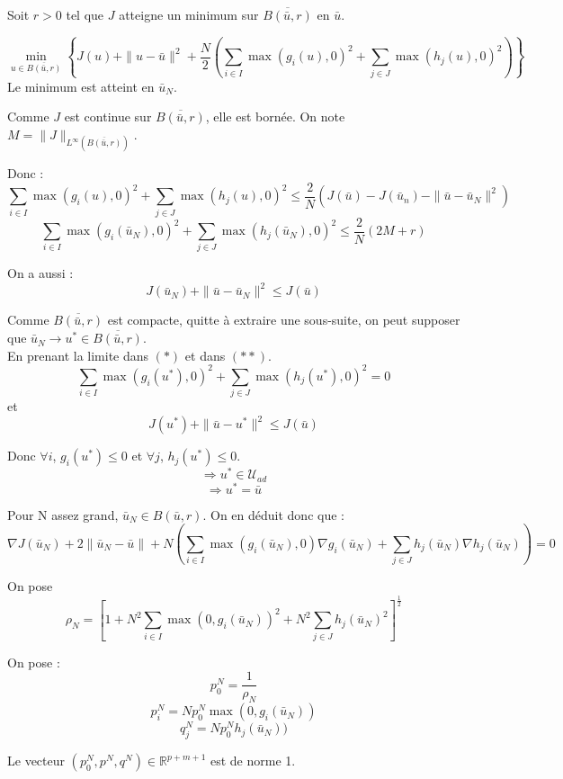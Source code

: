 \begin{dem}
Soit $r>0$ tel que $J$ atteigne un minimum sur $\overline{B(\bar{u},r)}$ en $\bar{u}$.

\[\min_{u\in\overline{B(\bar{u},r)}} \left\{J(u)+\|u-\bar{u}\|^2+\frac{N}{2}\left(\sum_{i\in I} \max (g_i(u),0)^2 + \sum_{j\in J} \max(h_j(u),0)^2 \right) \right\}\]
Le minimum est atteint en $\bar{u}_N$.

\bigskip
Comme $J$ est continue sur $\overline{B(\bar{u},r)}$, elle est bornée. On note $M=\|J\|_{L^\infty(\overline{B(\bar{u},r)})}$. 

\bigskip
Donc :
\[\sum_{i\in I} \max (g_i(u),0)^2 + \sum_{j\in J} \max(h_j(u),0)^2 \leq \frac{2}{N} \left(J(\bar{u})-J(\bar{u}_n)-\|\bar{u}-\bar{u}_N\|^2\right)\]
\begin{equation}\tag{$*$}
\sum_{i\in I} \max (g_i(\bar{u}_N),0)^2 + \sum_{j\in J} \max(h_j(\bar{u}_N),0)^2 \leq \frac{2}{N}(2M+r)
\end{equation}

On a aussi :
\begin{equation}\tag{$**$}
J(\bar{u}_N)+\|\bar{u}-\bar{u}_N\|^2 \leq J(\bar{u})
\end{equation}

Comme $\overline{B(\bar{u},r)}$ est compacte, quitte à extraire une sous-suite, on peut supposer que $\bar{u}_N\to u^*\in\overline{B(\bar{u},r)}$.\\
En prenant la limite dans $(*)$ et dans $(**)$.
\[\sum_{i\in I} \max (g_i(u^*),0)^2 + \sum_{j\in J} \max(h_j(u^*),0)^2 =0\]
et
\[J(u^*)+\|\bar{u}-u^*\|^2 \leq J(\bar{u})\]

Donc $\forall i$, $g_i(u^*)\leq 0$ et $\forall j$, $h_j(u^*)\leq 0$.
\[\Rightarrow u^*\in\mathcal{U}_{ad}\]
\[\Rightarrow u^*=\bar{u}\]

Pour N assez grand, $\bar{u}_N\in B(\bar{u},r)$. On en déduit donc que :
\begin{equation}
\tag{$*$}
\nabla J(\bar{u}_N)+2\|\bar{u}_N-\bar{u}\|+N\left(\sum_{i\in I} \max(g_i(\bar{u}_N),0)\nabla g_i(\bar{u}_N)+\sum_{j\in J} h_j(\bar{u}_N)\nabla h_j(\bar{u}_N)\right)=0
\end{equation}

On pose \[\rho_N=\left[ 1+N^2\sum_{i\in I} \max(0,g_i(\bar{u}_N))^2 + N^2\sum_{j\in J} h_j(\bar{u}_N)^2\right]^{\frac{1}{2}}\]

On pose :
\[p_0^N=\frac{1}{\rho_N}\]
\[p_i^N=Np_0^N \max(0,g_i(\bar{u}_N))\]
\[q_j^N=Np_0^N h_j(\bar{u}_N))\]

Le vecteur $\left( p_0^N, p^N, q^N\right)\in\mathbb{R}^{p+m+1}$ est de norme 1.


\end{dem}
